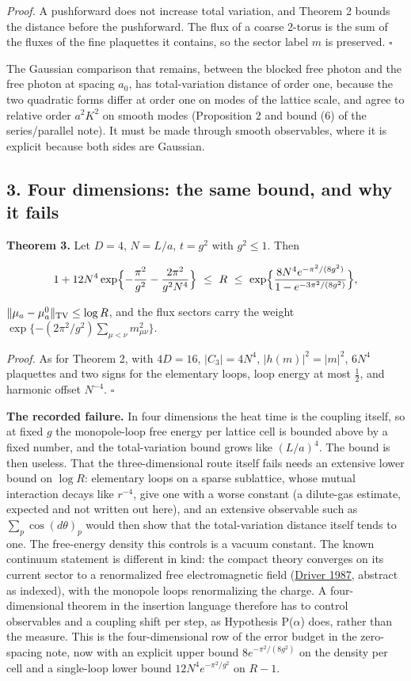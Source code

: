 \documentclass[11pt,a4paper]{article}
\begin{document}
\emph{Proof.} A pushforward does not increase total variation, and
Theorem 2 bounds the distance before the pushforward. The flux of a
coarse 2-torus is the sum of the fluxes of the fine plaquettes it
contains, so the sector label \(m\) is preserved. \(\square\)

The Gaussian comparison that remains, between the blocked free photon
and the free photon at spacing \(a_0\), has total-variation distance of
order one, because the two quadratic forms differ at order one on modes
of the lattice scale, and agree to relative order \(a^2K^2\) on smooth
modes (Proposition 2 and bound (6) of the series/parallel note). It must
be made through smooth observables, where it is explicit because both
sides are Gaussian.

\hypertarget{four-dimensions-the-same-bound-and-why-it-fails}{%
\subsection{3. Four dimensions: the same bound, and why it
fails}\label{four-dimensions-the-same-bound-and-why-it-fails}}

\textbf{Theorem 3.} Let \(D=4\), \(N=L/a\), \(t=g^2\) with \(g^2\le1\).
Then

\[1+12N^4\exp\Bigl\{-\frac{\pi^2}{g^2}-\frac{2\pi^2}{g^2N^4}\Bigr\}\ \le\ R\
\le\ \exp\Bigl\{\frac{8N^4e^{-\pi^2/(8g^2)}}{1-e^{-3\pi^2/(8g^2)}}\Bigr\},\]

\(\|\mu_a-\mu_a^0\|_{\rm TV}\le\log R\), and the flux sectors carry the
weight \(\exp\{-(2\pi^2/g^2)\sum_{\mu<\nu}m_{\mu\nu}^2\}\).

\emph{Proof.} As for Theorem 2, with \(4D=16\), \(|C_3|=4N^4\),
\(|h(m)|^2=|m|^2\), \(6N^4\) plaquettes and two signs for the elementary
loops, loop energy at most \(\frac12\), and harmonic offset \(N^{-4}\).
\(\square\)

\textbf{The recorded failure.} In four dimensions the heat time is the
coupling itself, so at fixed \(g\) the monopole-loop free energy per
lattice cell is bounded above by a fixed number, and the total-variation
bound grows like \((L/a)^4\). The bound is then useless. That the
three-dimensional route itself fails needs an extensive lower bound on
\(\log R\): elementary loops on a sparse sublattice, whose mutual
interaction decays like \(r^{-4}\), give one with a worse constant (a
dilute-gas estimate, expected and not written out here), and an
extensive observable such as \(\sum_p\cos(d\theta)_p\) would then show
that the total-variation distance itself tends to one. The free-energy
density this controls is a vacuum constant. The known continuum
statement is different in kind: the compact theory converges on its
current sector to a renormalized free electromagnetic field
(\href{https://doi.org/10.1007/BF01212424}{Driver 1987}, abstract as
indexed), with the monopole loops renormalizing the charge. A
four-dimensional theorem in the insertion language therefore has to
control observables and a coupling shift per step, as Hypothesis
P(\(\alpha\)) does, rather than the measure. This is the
four-dimensional row of the error budget in the zero-spacing note, now
with an explicit upper bound \(8e^{-\pi^2/(8g^2)}\) on the density per
cell and a single-loop lower bound \(12N^4e^{-\pi^2/g^2}\) on \(R-1\).
\end{document}
